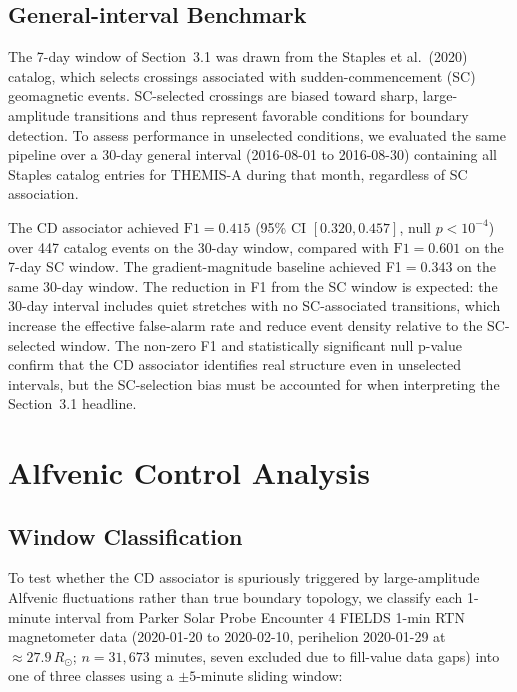 \documentclass[draft]{agujournal2025}
\let\citep\cite%
\begin{document}
\subsection{General-interval Benchmark}
\label{sec:general_benchmark}

The 7-day window of Section~3.1 was drawn from the Staples et al.\ (2020)
catalog, which selects crossings associated with sudden-commencement (SC)
geomagnetic events.
SC-selected crossings are biased toward sharp, large-amplitude transitions
and thus represent favorable conditions for boundary detection.
To assess performance in unselected conditions, we evaluated the same pipeline
over a 30-day general interval (2016-08-01 to 2016-08-30) containing all
Staples catalog entries for THEMIS-A during that month, regardless of SC association.

The CD associator achieved $\mathrm{F1}=0.415$ (95\% CI $[0.320, 0.457]$,
null $p < 10^{-4}$) over 447 catalog events on the 30-day window, compared with
$\mathrm{F1}=0.601$ on the 7-day SC window.
The gradient-magnitude baseline achieved F1$=0.343$ on the same 30-day window.
The reduction in F1 from the SC window is expected: the 30-day interval includes
quiet stretches with no SC-associated transitions, which increase the effective
false-alarm rate and reduce event density relative to the SC-selected window.
The non-zero F1 and statistically significant null p-value confirm that the CD
associator identifies real structure even in unselected intervals, but the
SC-selection bias must be accounted for when interpreting the Section~3.1 headline.

\section{Alfvenic Control Analysis}
\label{sec:alfven_control}

\subsection{Window Classification}

To test whether the CD associator is spuriously triggered by large-amplitude
Alfvenic fluctuations rather than true boundary topology, we classify each
1-minute interval from Parker Solar Probe \citep{fox2016} Encounter 4
FIELDS \citep{bale2016} 1-min RTN magnetometer data
(2020-01-20 to 2020-02-10, perihelion 2020-01-29 at $\approx 27.9\,R_\odot$;
$n = 31{,}673$ minutes, seven excluded due to fill-value data gaps) into one of three classes
using a $\pm 5$-minute sliding window:
\end{document}
